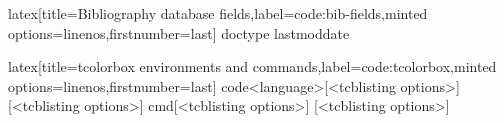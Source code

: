 \begin{code}{latex}[title={Bibliography database fields},label=code:bib-fields,minted options={linenos,firstnumber=last}]
doctype
lastmoddate
\end{code}
%
\begin{code}{latex}[title={tcolorbox environments and commands},label=code:tcolorbox,minted options={linenos,firstnumber=last}]
{code}{<language>}[<tcblisting options>]
[<tcblisting options>]
{cmd}[<tcblisting options>]
[<tcblisting options>]
\end{code}

\begin{comment}

\clearpage
\subsection{subsection 1}

\section{Test appendix 2}

\section{Test appendix 3}
\clearpage
\subsection{subsection 1}
\clearpage
\subsection{subsection 2}

\end{comment}
